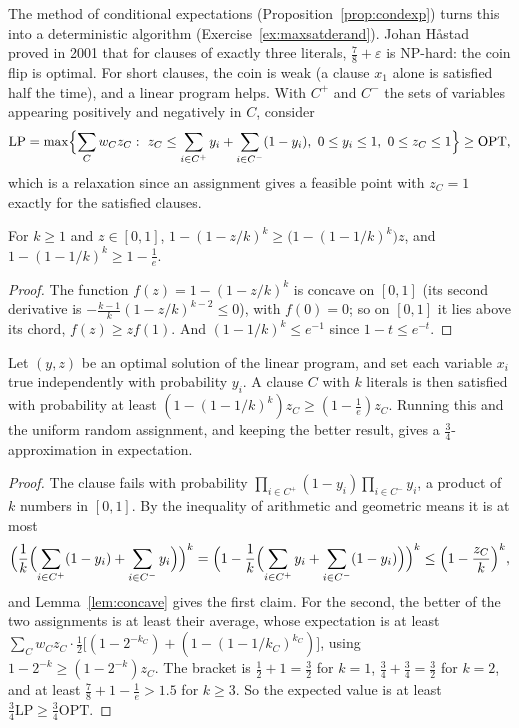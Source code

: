The method of conditional expectations (Proposition~\ref{prop:condexp}) turns this into a deterministic algorithm (Exercise~\ref{ex:maxsatderand}). Johan Håstad proved in 2001 that for clauses of exactly three literals, $\frac78+\varepsilon$ is NP-hard: the coin flip is optimal. For short clauses, the coin is weak (a clause $x_1$ alone is satisfied half the time), and a linear program helps. With $C^+$ and $C^-$ the sets of variables appearing positively and negatively in $C$, consider
\[
\mathrm{LP}=\max\Bigl\{\sum_Cw_Cz_C:\ z_C\le\sum_{i\in C^+}y_i+\sum_{i\in C^-}(1-y_i),\ 0\le y_i\le1,\ 0\le z_C\le1\Bigr\}\ge\mathrm{OPT},
\]
which is a relaxation since an assignment gives a feasible point with $z_C=1$ exactly for the satisfied clauses.

\begin{lemma}\label{lem:concave}
For $k\ge1$ and $z\in[0,1]$, $1-(1-z/k)^k\ge\bigl(1-(1-1/k)^k\bigr)z$, and $1-(1-1/k)^k\ge1-\frac1e$.
\end{lemma}
\begin{proof}
The function $f(z)=1-(1-z/k)^k$ is concave on $[0,1]$ (its second derivative is $-\frac{k-1}k(1-z/k)^{k-2}\le0$), with $f(0)=0$; so on $[0,1]$ it lies above its chord, $f(z)\ge zf(1)$. And $(1-1/k)^k\le e^{-1}$ since $1-t\le e^{-t}$.
\end{proof}

\begin{theorem}\label{thm:maxsat}
Let $(y,z)$ be an optimal solution of the linear program, and set each variable $x_i$ true independently with probability $y_i$. A clause $C$ with $k$ literals is then satisfied with probability at least $(1-(1-1/k)^k)z_C\ge(1-\frac1e)z_C$. Running this and the uniform random assignment, and keeping the better result, gives a $\frac34$-approximation in expectation.
\end{theorem}
\begin{proof}
The clause fails with probability $\prod_{i\in C^+}(1-y_i)\prod_{i\in C^-}y_i$, a product of $k$ numbers in $[0,1]$. By the inequality of arithmetic and geometric means it is at most
\[
\Bigl(\frac1k\Bigl(\sum_{i\in C^+}(1-y_i)+\sum_{i\in C^-}y_i\Bigr)\Bigr)^k=\Bigl(1-\frac1k\Bigl(\sum_{i\in C^+}y_i+\sum_{i\in C^-}(1-y_i)\Bigr)\Bigr)^k\le\Bigl(1-\frac{z_C}k\Bigr)^k,
\]
and Lemma~\ref{lem:concave} gives the first claim. For the second, the better of the two assignments is at least their average, whose expectation is at least $\sum_Cw_Cz_C\cdot\frac12\bigl[(1-2^{-k_C})+(1-(1-1/k_C)^{k_C})\bigr]$, using $1-2^{-k}\ge(1-2^{-k})z_C$. The bracket is $\frac12+1=\frac32$ for $k=1$, $\frac34+\frac34=\frac32$ for $k=2$, and at least $\frac78+1-\frac1e>1.5$ for $k\ge3$. So the expected value is at least $\frac34\mathrm{LP}\ge\frac34\mathrm{OPT}$.
\end{proof}

